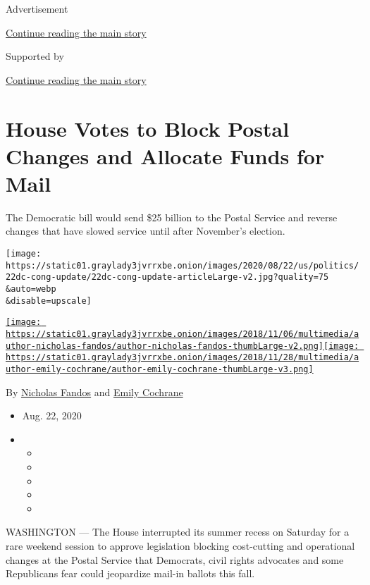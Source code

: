 Advertisement

\protect\hyperlink{after-top}{Continue reading the main story}

Supported by

\protect\hyperlink{after-sponsor}{Continue reading the main story}

\hypertarget{house-votes-to-block-postal-changes-and-allocate-funds-for-mail}{%
\section{House Votes to Block Postal Changes and Allocate Funds for
Mail}\label{house-votes-to-block-postal-changes-and-allocate-funds-for-mail}}

The Democratic bill would send \$25 billion to the Postal Service and
reverse changes that have slowed service until after November's
election.

\texttt{[image: https://static01.graylady3jvrrxbe.onion/images/2020/08/22/us/politics/22dc-cong-update/22dc-cong-update-articleLarge-v2.jpg?quality=75\\\&auto=webp\\\&disable=upscale]}

\href{https://www.nytimes3xbfgragh.onion/by/nicholas-fandos}{\texttt{[image: https://static01.graylady3jvrrxbe.onion/images/2018/11/06/multimedia/author-nicholas-fandos/author-nicholas-fandos-thumbLarge-v2.png]}}\href{https://www.nytimes3xbfgragh.onion/by/emily-cochrane}{\texttt{[image: https://static01.graylady3jvrrxbe.onion/images/2018/11/28/multimedia/author-emily-cochrane/author-emily-cochrane-thumbLarge-v3.png]}}

By \href{https://www.nytimes3xbfgragh.onion/by/nicholas-fandos}{Nicholas
Fandos} and
\href{https://www.nytimes3xbfgragh.onion/by/emily-cochrane}{Emily
Cochrane}

\begin{itemize}
\item
  Aug. 22, 2020
\item
  \begin{itemize}
  \item
  \item
  \item
  \item
  \item
  \end{itemize}
\end{itemize}

WASHINGTON --- The House interrupted its summer recess on Saturday for a
rare weekend session to approve legislation blocking cost-cutting and
operational changes at the Postal Service that Democrats, civil rights
advocates and some Republicans fear could jeopardize mail-in ballots
this fall.

